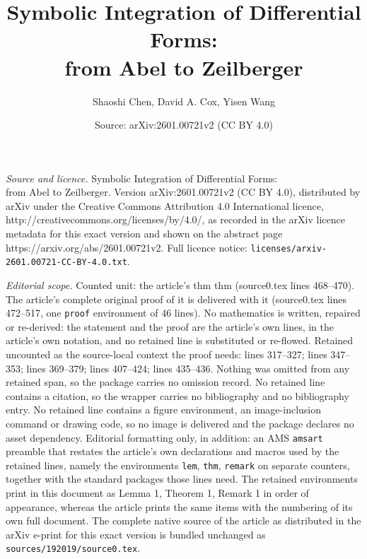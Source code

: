 \documentclass[10pt,a4paper]{amsart}
\title{Symbolic Integration of Differential Forms:\\ from Abel to Zeilberger}
\author{Shaoshi Chen, David A. Cox, Yisen Wang}
\date{Source: arXiv:2601.00721v2 (CC BY 4.0)}
\begin{document}
\maketitle

\noindent\emph{Source and licence.} Symbolic Integration of Differential Forms:\\ from Abel to Zeilberger. Version arXiv:2601.00721v2 (CC BY 4.0), distributed by arXiv under the Creative Commons Attribution 4.0 International licence, http://creativecommons.org/licenses/by/4.0/, as recorded in the arXiv licence metadata for this exact version and shown on the abstract page https://arxiv.org/abs/2601.00721v2. Full licence notice: \texttt{licenses/arxiv-2601.00721-CC-BY-4.0.txt}.\par\smallskip

\noindent\textit{Editorial scope.} Counted unit: the article's thm thm (source0.tex lines 468--470). The article's complete original proof of it is delivered with it (source0.tex lines 472--517, one \texttt{proof} environment of 46 lines). No mathematics is written, repaired or re-derived: the statement and the proof are the article's own lines, in the article's own notation, and no retained line is substituted or re-flowed.  Retained uncounted as the source-local context the proof needs: lines 317--327; lines 347--353; lines 369--379; lines 407--424; lines 435--436.  Nothing was omitted from any retained span, so the package carries no omission record.  No retained line contains a citation, so the wrapper carries no bibliography and no bibliography entry.  No retained line contains a figure environment, an image-inclusion command or drawing code, so no image is delivered and the package declares no asset dependency.  Editorial formatting only, in addition: an AMS \texttt{amsart} preamble that restates the article's own declarations and macros used by the retained lines, namely the environments \texttt{lem}, \texttt{thm}, \texttt{remark} on separate counters, together with the standard packages those lines need.  The retained environments print in this document as Lemma 1, Theorem 1, Remark 1 in order of appearance, whereas the article prints the same items with the numbering of its own full document.  The complete native source of the article as distributed in the arXiv e-print for this exact version is bundled unchanged as \texttt{sources/192019/source0.tex}.
\end{document}
